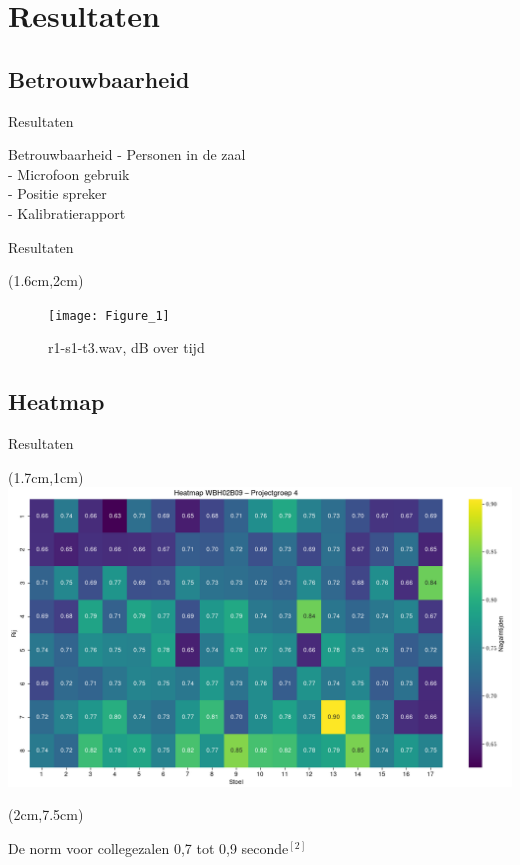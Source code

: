 \documentclass{beamer}
\begin{document}
\section{Resultaten}
\subsection{Betrouwbaarheid}
\begin{frame}{Resultaten}
\begin{block}{Betrouwbaarheid}
 - Personen in de zaal\\
 - Microfoon gebruik\\
 - Positie spreker\\
 - Kalibratierapport
\end{block}
\end{frame}
\begin{frame}{Resultaten}
\begin{textblock*}{5cm}(1.6cm,2cm)
  \begin{figure}
  \texttt{[image: Figure\_1]}
  \caption{r1-s1-t3.wav, dB over tijd}
\end{figure}
\end{textblock*}
\end{frame}

\subsection{Heatmap}
\begin{frame}{Resultaten}
\begin{textblock*}{5cm}(1.7cm,1cm)
  \includegraphics[scale=.37]{heatmap}
\end{textblock*}
\begin{textblock*}{8cm}(2cm,7.5cm)
\begin{block}{De norm voor collegezalen}
  0,7 tot 0,9 seconde$^{[2]}$
\end{block}
\end{textblock*}
\end{frame}
\end{document}
